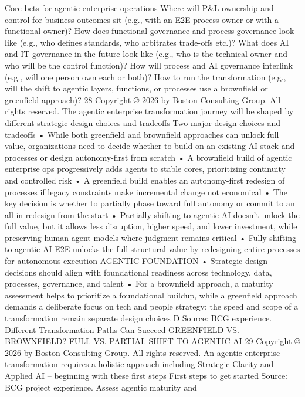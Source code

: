 Core bets for agentic enterprise operations
Where will P\&L ownership and control for business outcomes sit
(e.g., with an E2E process owner or with a functional owner)?
How does functional governance and process governance look
like (e.g., who defines standards, who arbitrates trade-offs etc.)?
What does AI and IT governance in the future look like (e.g., who
is the technical owner and who will be the control function)?
How will process and AI governance interlink (e.g., will one
person own each or both)?
How to run the transformation (e.g., will the shift to agentic layers,
functions, or processes use a brownfield or greenfield approach)?
28
Copyright © 2026 by Boston Consulting Group. All rights reserved.
The agentic enterprise transformation journey will be shaped by different
strategic design choices and tradeoffs
Two major design choices and tradeoffs
•
While both greenfield and brownfield approaches can unlock full
value, organizations need to decide whether to build on an existing
AI stack and processes or design autonomy-first from scratch
•
A brownfield build of agentic enterprise ops progressively adds
agents to stable cores, prioritizing continuity and controlled risk
•
A greenfield build enables an autonomy-first redesign of processes if
legacy constraints make incremental change not economical
•
The key decision is whether to partially phase toward full
autonomy or commit to an all-in redesign from the start
•
Partially shifting to agentic AI doesn’t unlock the full value, but
it allows less disruption, higher speed, and lower investment, while
preserving human-agent models where judgment remains critical
•
Fully shifting to agentic AI E2E unlocks the full structural value
by redesigning entire processes for autonomous execution
AGENTIC FOUNDATION
•
Strategic design decisions should align with foundational readiness across technology, data, processes, governance, and talent
•
For a brownfield approach, a maturity assessment helps to prioritize a foundational buildup, while a greenfield approach demands
a deliberate focus on tech and people strategy; the speed and scope of a transformation remain separate design choices
D
Source: BCG experience.
Different Transformation Paths Can Succeed
GREENFIELD VS. BROWNFIELD?
FULL VS. PARTIAL SHIFT TO AGENTIC AI
29
Copyright © 2026 by Boston Consulting Group. All rights reserved.
An agentic enterprise transformation requires a holistic approach
including Strategic Clarity and Applied AI – beginning with these first steps
First steps to get started
Source: BCG project experience.
Assess agentic maturity and
